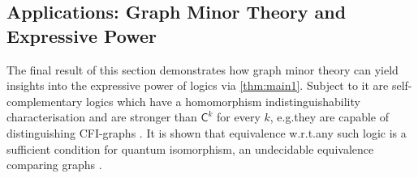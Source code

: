 \documentclass[3p,final]{elsarticle}
\renewcommand\phi\varphi
\newtheorem{lemma}[theorem]{Lemma}
\begin{document}
%	
%	
	
	

	\subsection{Applications: Graph Minor Theory and Expressive Power}


	The final result of this section demonstrates how graph minor theory can yield insights into the expressive power of logics via \cref{thm:main1}.
	Subject to it are self-complementary logics which have a homomorphism indistinguishability characterisation and are stronger than $\mathsf{C}^k$ for every $k$, e.g.\@ they are capable of distinguishing CFI-graphs \cite{cai_optimal_1992}.
	It is shown that equivalence w.r.t.\@ any such logic is a sufficient condition for quantum isomorphism, an undecidable equivalence comparing graphs \cite{atserias_quantum_2019}.
		
\end{document}
